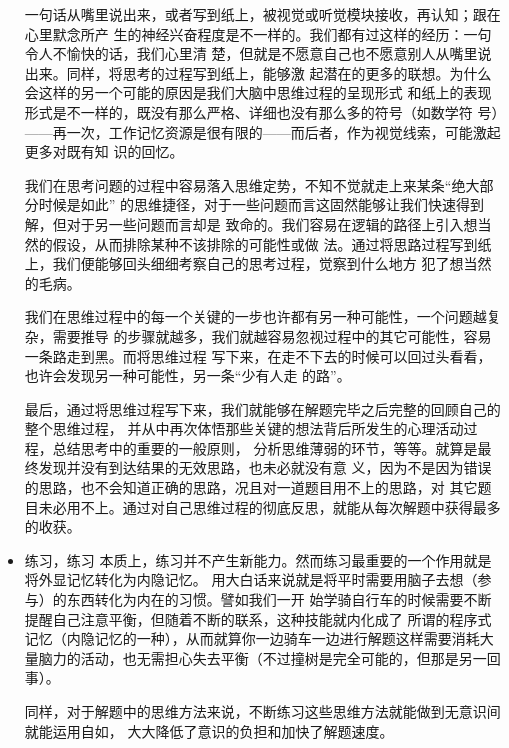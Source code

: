\documentclass[11pt]{article}
\begin{document}
\begin{itemize}
一句话从嘴里说出来，或者写到纸上，被视觉或听觉模块接收，再认知；跟在心里默念所产
生的神经兴奋程度是不一样的。我们都有过这样的经历：一句令人不愉快的话，我们心里清
楚，但就是不愿意自己也不愿意别人从嘴里说出来。同样，将思考的过程写到纸上，能够激
起潜在的更多的联想。为什么会这样的另一个可能的原因是我们大脑中思维过程的呈现形式
和纸上的表现形式是不一样的，既没有那么严格、详细也没有那么多的符号（如数学符
号）——再一次，工作记忆资源是很有限的——而后者，作为视觉线索，可能激起更多对既有知
识的回忆。

我们在思考问题的过程中容易落入思维定势，不知不觉就走上来某条“绝大部分时候是如此”
的思维捷径，对于一些问题而言这固然能够让我们快速得到解，但对于另一些问题而言却是
致命的。我们容易在逻辑的路径上引入想当然的假设，从而排除某种不该排除的可能性或做
法。通过将思路过程写到纸上，我们便能够回头细细考察自己的思考过程，觉察到什么地方
犯了想当然的毛病。

我们在思维过程中的每一个关键的一步也许都有另一种可能性，一个问题越复杂，需要推导
的步骤就越多，我们就越容易忽视过程中的其它可能性，容易一条路走到黑。而将思维过程
写下来，在走不下去的时候可以回过头看看，也许会发现另一种可能性，另一条“少有人走
的路”。

最后，通过将思维过程写下来，我们就能够在解题完毕之后完整的回顾自己的整个思维过程，
并从中再次体悟那些关键的想法背后所发生的心理活动过程，总结思考中的重要的一般原则，
分析思维薄弱的环节，等等。就算是最终发现并没有到达结果的无效思路，也未必就没有意
义，因为不是因为错误的思路，也不会知道正确的思路，况且对一道题目用不上的思路，对
其它题目未必用不上。通过对自己思维过程的彻底反思，就能从每次解题中获得最多的收获。
\item 练习，练习
\label{sec:orgheadline205}
本质上，练习并不产生新能力。然而练习最重要的一个作用就是将外显记忆转化为内隐记忆。
用大白话来说就是将平时需要用脑子去想（参与）的东西转化为内在的习惯。譬如我们一开
始学骑自行车的时候需要不断提醒自己注意平衡，但随着不断的联系，这种技能就内化成了
所谓的程序式记忆（内隐记忆的一种），从而就算你一边骑车一边进行解题这样需要消耗大
量脑力的活动，也无需担心失去平衡（不过撞树是完全可能的，但那是另一回事）。

同样，对于解题中的思维方法来说，不断练习这些思维方法就能做到无意识间就能运用自如，
大大降低了意识的负担和加快了解题速度。


\end{itemize}
\end{document}
